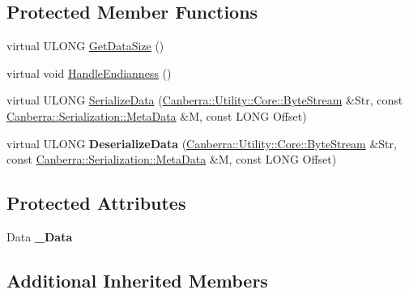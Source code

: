 \subsection*{Protected Member Functions}
\begin{DoxyCompactItemize}
\item 
virtual U\+L\+O\+NG \hyperlink{class_canberra_1_1_data_types_1_1_spectroscopy_1_1_spectral_data_impl_aa681684f88b9e64aa2b8208f4525863d_aa681684f88b9e64aa2b8208f4525863d}{Get\+Data\+Size} ()
\item 
virtual void \hyperlink{class_canberra_1_1_data_types_1_1_spectroscopy_1_1_spectral_data_impl_add8a76fab9523229280ad47efb9b5bf0_add8a76fab9523229280ad47efb9b5bf0}{Handle\+Endianness} ()
\item 
virtual U\+L\+O\+NG \hyperlink{class_canberra_1_1_data_types_1_1_spectroscopy_1_1_spectral_data_impl_a4d4c4af29ad5f4fc977068478cdc8aeb_a4d4c4af29ad5f4fc977068478cdc8aeb}{Serialize\+Data} (\hyperlink{class_canberra_1_1_utility_1_1_core_1_1_byte_stream}{Canberra\+::\+Utility\+::\+Core\+::\+Byte\+Stream} \&Str, const \hyperlink{class_canberra_1_1_serialization_1_1_meta_data}{Canberra\+::\+Serialization\+::\+Meta\+Data} \&M, const L\+O\+NG Offset)
\item 
\mbox{\label{class_canberra_1_1_data_types_1_1_spectroscopy_1_1_spectral_data_impl_ad6fcc641ea412d0b637ae7f870949f5e}} 
virtual U\+L\+O\+NG {\bfseries Deserialize\+Data} (\hyperlink{class_canberra_1_1_utility_1_1_core_1_1_byte_stream}{Canberra\+::\+Utility\+::\+Core\+::\+Byte\+Stream} \&Str, const \hyperlink{class_canberra_1_1_serialization_1_1_meta_data}{Canberra\+::\+Serialization\+::\+Meta\+Data} \&M, const L\+O\+NG Offset)
\end{DoxyCompactItemize}
\subsection*{Protected Attributes}
\begin{DoxyCompactItemize}
\item 
\mbox{\label{class_canberra_1_1_data_types_1_1_spectroscopy_1_1_spectral_data_impl_a9bad0cab7f3285a457718cd3ac405d32}} 
Data {\bfseries \+\_\+\+Data}
\end{DoxyCompactItemize}
\subsection*{Additional Inherited Members}


